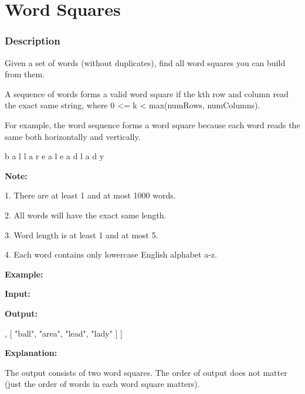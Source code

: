 \newpage

\section{Word Squares} %
\subsubsection{Description}
Given a set of words (without duplicates), find all word squares you can build from them.

A sequence of words forms a valid word square if the kth row and column read the exact same string, where 0 <= k < max(numRows, numColumns).

For example, the word sequence  forms a word square because each word reads the same both horizontally and vertically.

\begin{Code}
b a l l
a r e a
l e a d
l a d y
\end{Code}

\textbf{Note:}

1. There are at least 1 and at most 1000 words.

2. All words will have the exact same length.

3. Word length is at least 1 and at most 5.

4. Each word contains only lowercase English alphabet a-z.


\textbf{Example:}

\textbf{Input:}


\textbf{Output:}
\begin{Code}
[
  [ "wall",
    "area",
    "lead",
    "lady"
  ],
  [ "ball",
    "area",
    "lead",
    "lady"
  ]
]
\end{Code}
\textbf{Explanation:}

The output consists of two word squares. The order of output does not matter (just the order of words in each word square matters).
\newpage

